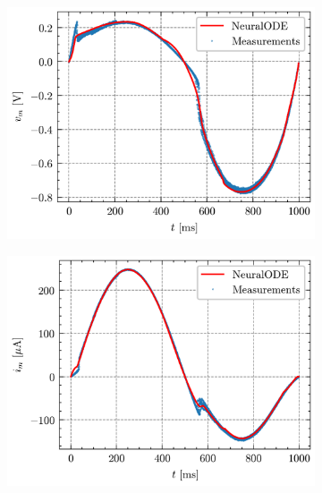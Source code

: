 \documentclass[11pt, oneside]{article}
\begin{document}
\newcommand{\subwidth}{0.32\linewidth}
\begin{figure}[H]
    \centering
    \begin{subfigure}[b]{\subwidth}
        \includegraphics[width=\linewidth]{sample_results/v_m.png}
        \caption{}
    \end{subfigure}
    \begin{subfigure}[b]{\subwidth}
        \includegraphics[width=\linewidth]{sample_results/i_m.png}
        \caption{}
    \end{subfigure}
    \begin{subfigure}[b]{\subwidth}

\end{subfigure}
\end{figure}
\end{document}
